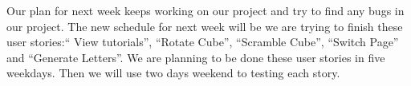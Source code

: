 \documentclass[12pt]{article}
\begin{document}
\par Our plan for next week keeps working on our project and try to find any bugs in our project. The new schedule for next week will be we are trying to finish these user stories:“ View tutorials”, “Rotate Cube”, “Scramble Cube”, “Switch Page” and “Generate Letters”. We are planning to be done these user stories in five weekdays. Then we will use two days weekend to testing each story. \\
\end{document}

